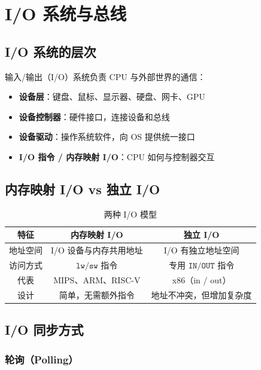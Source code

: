 \clearpage
\vspace*{\fill}
\section{I/O 系统与总线}
\vspace*{\fill}
\clearpage


\subsection{I/O 系统的层次}

输入/输出（I/O）系统负责 CPU 与外部世界的通信：

\begin{itemize}
    \item \textbf{设备层}：键盘、鼠标、显示器、硬盘、网卡、GPU
    \item \textbf{设备控制器}：硬件接口，连接设备和总线
    \item \textbf{设备驱动}：操作系统软件，向 OS 提供统一接口
    \item \textbf{I/O 指令 / 内存映射 I/O}：CPU 如何与控制器交互
\end{itemize}

\subsection{内存映射 I/O vs 独立 I/O}

\begin{table}[H]
\centering
\caption{两种 I/O 模型}
\label{tab:io_models}
\begin{tabulary}{\textwidth}{CCC}
\toprule
\textbf{特征} & \textbf{内存映射 I/O} & \textbf{独立 I/O} \\
\midrule
地址空间 & I/O 设备与内存共用地址 & I/O 有独立地址空间 \\
访问方式 & $\texttt{lw/sw}$ 指令 & 专用 $\texttt{IN/OUT}$ 指令 \\
代表 & MIPS、ARM、RISC-V & x86（in / out） \\
设计 & 简单，无需额外指令 & 地址不冲突，但增加复杂度 \\
\bottomrule
\end{tabulary}
\end{table}

\subsection{I/O 同步方式}

\subsubsection{轮询（Polling）}

